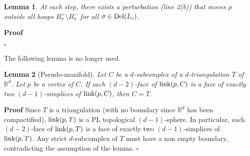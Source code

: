 \documentclass[11pt,a4paper]{article}
\newtheorem{lemma}{Lemma}
\newenvironment{proof}
        {\noindent \textbf{Proof} \hspace{0.3mm}}
        {\hspace{0.3mm}$\square$  \smallskip}
\newcommand{\R}{\mathbb R}
\newcommand{\link}{{\rm link}}
\newcommand{\del}{{\rm Del}}
\newcommand{\wit}{{\rm Wit}}
\begin{document}
\begin{lemma}
At each step, there exists a perturbation (line 2(b)) that moves $p$ outside all
hoops  $B_{\sigma}^+ \setminus B_{\sigma}^-$ for all $\sigma\in \del (L_c)$. 
\end{lemma}

\begin{proof}



\end{proof}


The following lemma is no longer used.

\begin{lemma}[Pseudo-manifold]
\label{lemma-pseudoman}
Let $C$  be a $d$-subcomplex of a $d$-triangulation $T$ of $\R^d$. Let
 $p$ be  a vertex of $C$. If each $(d-2)$-face of $\link (p,C)$ is a face of exactly two
  $(d-1)$-simplices of $\link (p,C)$, then $C=T$.
\end{lemma}

\begin{proof}
Since $T$ is a triangulation (with no
boundary since $\R^d$ has been compactified), $\link(p,T)$ is a PL
topological $(d-1)$-sphere. In particular, each $(d-2)$-face of $\link (p,T)$ is a face of exactly two
  $(d-1)$-simplices of $\link (p,T)$. Any strict $d$-subcomplex of $T$
  must have a non empty boundary, contradicting
the assumption of the lemma.
\end{proof}




\end{document}
